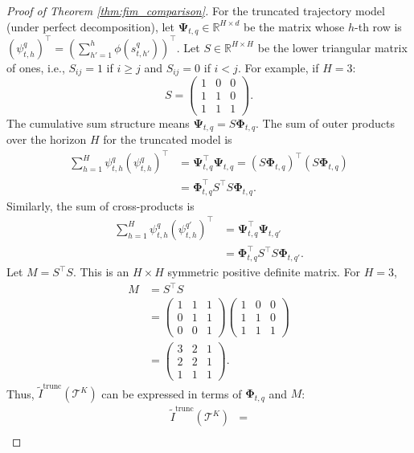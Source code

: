 \documentclass[10pt,a4paper]{amsart}
\newcommand{\bPhi}{\mathbf{\Phi}}
\newcommand{\bPsi}{\mathbf{\Psi}}
\begin{document}
\begin{proof}[Proof of Theorem \ref{thm:fim_comparison}]
For the truncated trajectory model (under perfect decomposition), let $\bPsi_{t,q} \in \mathbb{R}^{H \times d}$ be the matrix whose $h$-th row is $(\psi^q_{t,h})^\top = \left(\sum_{h'=1}^h \phi(s^q_{t,h'})\right)^\top$.
Let $S \in \mathbb{R}^{H \times H}$ be the lower triangular matrix of ones, i.e., $S_{ij}=1$ if $i \ge j$ and $S_{ij}=0$ if $i < j$. For example, if $H=3$:
\[ S = \begin{pmatrix} 1 & 0 & 0 \\ 1 & 1 & 0 \\ 1 & 1 & 1 \end{pmatrix}. \]
The cumulative sum structure means $\bPsi_{t,q} = S \bPhi_{t,q}$.
The sum of outer products over the horizon $H$ for the truncated model is
\begin{align*}
\sum_{h=1}^H \psi^q_{t,h}(\psi^q_{t,h})^\top
&= \bPsi_{t,q}^\top \bPsi_{t,q}
 = (S \bPhi_{t,q})^\top (S \bPhi_{t,q}) \\
&= \bPhi_{t,q}^\top S^\top S \bPhi_{t,q}.
\end{align*}
Similarly, the sum of cross-products is
\begin{align*}
\sum_{h=1}^H \psi^q_{t,h}(\psi^{q'}_{t,h})^\top
&= \bPsi_{t,q}^\top \bPsi_{t,q'} \\
&= \bPhi_{t,q}^\top S^\top S \bPhi_{t,q'}.
\end{align*}
Let $M = S^\top S$. This is an $H \times H$ symmetric positive definite matrix. For $H=3$,
\begin{align*}
M &= S^\top S \\
&= \begin{pmatrix} 1 & 1 & 1 \\ 0 & 1 & 1 \\ 0 & 0 & 1 \end{pmatrix}
   \begin{pmatrix} 1 & 0 & 0 \\ 1 & 1 & 0 \\ 1 & 1 & 1 \end{pmatrix} \\
&= \begin{pmatrix} 3 & 2 & 1 \\ 2 & 2 & 1 \\ 1 & 1 & 1 \end{pmatrix}.
\end{align*}
Thus, $\tilde{I}^{\text{trunc}}(\mathcal{T}^K)$ can be expressed in terms of $\bPhi_{t,q}$ and $M$:
\begin{align*}
\tilde{I}^{\text{trunc}}(\mathcal{T}^K)
&= \\

\end{align*}
\end{proof}
\end{document}
